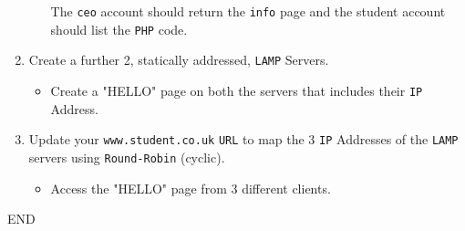 \documentclass[11pt]{article}
\begin{document}
\begin{enumerate}
\begin{itemize}
\begin{tcolorbox}[title={\textbf{NOTE:}}]
                    \noindent The \texttt{ceo} account should return the \texttt{info} page and the student account should list the \texttt{PHP} code.
                \end{tcolorbox}
            \end{itemize}
    \item Create a further 2, statically addressed, \texttt{LAMP} Servers.
        \begin{itemize}
            \item Create a "HELLO" page on both the servers that includes their \texttt{IP} Address.
        \end{itemize}
    \item Update your \texttt{www.student.co.uk} \texttt{URL} to map the 3 \texttt{IP} Addresses of the \texttt{LAMP} servers using \texttt{Round-Robin} (cyclic).
        \begin{itemize}
            \item Access the "HELLO" page from 3 different clients.
        \end{itemize}
\end{enumerate}    
END
\end{document}
